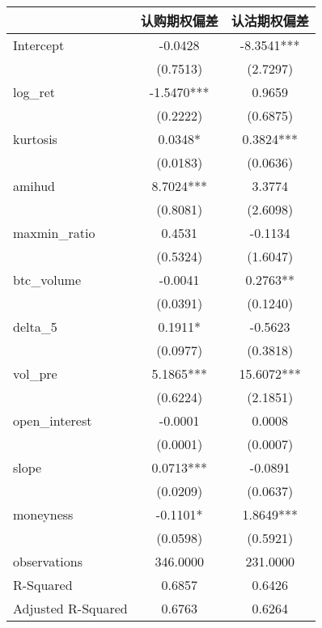 \begin{tabular}{lcc}
\hline
                   &   认购期权偏差   &   认沽期权偏差    \\
\midrule
\midrule
Intercept          & -0.0428    & -8.3541***  \\
                   & (0.7513)   & (2.7297)    \\
log\_ret           & -1.5470*** & 0.9659      \\
                   & (0.2222)   & (0.6875)    \\
kurtosis           & 0.0348*    & 0.3824***   \\
                   & (0.0183)   & (0.0636)    \\
amihud             & 8.7024***  & 3.3774      \\
                   & (0.8081)   & (2.6098)    \\
maxmin\_ratio      & 0.4531     & -0.1134     \\
                   & (0.5324)   & (1.6047)    \\
btc\_volume        & -0.0041    & 0.2763**    \\
                   & (0.0391)   & (0.1240)    \\
delta\_5           & 0.1911*    & -0.5623     \\
                   & (0.0977)   & (0.3818)    \\
vol\_pre           & 5.1865***  & 15.6072***  \\
                   & (0.6224)   & (2.1851)    \\
open\_interest     & -0.0001    & 0.0008      \\
                   & (0.0001)   & (0.0007)    \\
slope              & 0.0713***  & -0.0891     \\
                   & (0.0209)   & (0.0637)    \\
moneyness          & -0.1101*   & 1.8649***   \\
                   & (0.0598)   & (0.5921)    \\
observations       & 346.0000   & 231.0000    \\
R-Squared          & 0.6857     & 0.6426      \\
Adjusted R-Squared & 0.6763     & 0.6264      \\
\hline
\end{tabular}